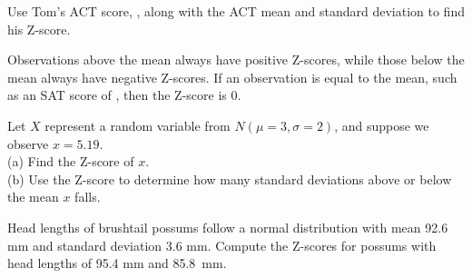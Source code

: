 \begin{exercisewrap}
\begin{nexercise}
Use Tom's ACT score, \tomsatscore{}, along with the ACT mean and
standard deviation to find his Z-score.\footnotemark{}
\end{nexercise}
\end{exercisewrap}

Observations above the mean always have positive Z-scores,
while those below the mean always have negative Z-scores.
If an observation is equal to the mean,
such as an SAT score of \satmean{}, then the Z-score is $0$.

\begin{exercisewrap}
\begin{nexercise}
Let $X$ represent a random variable from $N(\mu=3, \sigma=2)$,
and suppose we observe $x=5.19$. \\
(a)
    Find the Z-score of $x$. \\
(b)
    Use the Z-score to determine how many standard deviations
    above or below the mean $x$ falls.\footnotemark{}
\end{nexercise}
\end{exercisewrap}

\begin{exercisewrap}
\begin{nexercise} \label{headLZScore}
Head lengths of brushtail possums follow a normal
distribution with mean 92.6 mm and standard deviation 3.6 mm.
Compute the Z-scores for possums with head lengths of 95.4 mm
and 85.8~mm.\footnotemark{}
\end{nexercise}
\end{exercisewrap}

